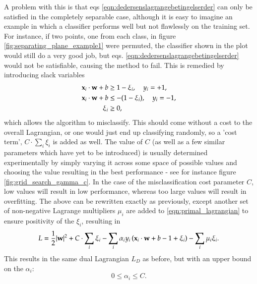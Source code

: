 A problem with this is that eqs \ref{eqn:dedersenslagrangebetingelserder} can only be satisfied in the completely separable case, although it is easy to imagine an example in which a classifier performs well but not flawlessly on the training set. For instance, if two points, one from each class, in figure \ref{fig:separating_plane_example1} were permuted, the classifier shown in the plot would still do a very good job, but eqs. \ref{eqn:dedersenslagrangebetingelserder} would not be satisfiable, causing the method to fail. This is remedied by introducing slack variables\cite{Boyd2004}
\begin{align}
\begin{split}
		\mathbf{x}_i\cdot \mathbf{w} + b &\ge 1 - \xi_i,\quad y_i = +1, \\
		\mathbf{x}_i\cdot \mathbf{w} + b &\le -(1 - \xi_i),\quad y_i = -1, \\
		\xi_i &\ge 0,
\end{split} \label{eqn:slack_variables}
\end{align}
which allows the algorithm to misclassify. This should come without a cost to the overall Lagrangian, or one would just end up classifying randomly, so a 'cost term', $C\cdot\sum_i\xi_i$ is added as well. The value of $C$ (as well as a few similar parameters which have yet to be introduced) is usually determined experimentally by simply varying it across some space of possible values and choosing the value resulting in the best performance - see for instance figure \ref{fig:grid_search_gamma_c}. In the case of the misclassification cost parameter $C$, low values will result in low performance, whereas too large values will result in overfitting. The above can be rewritten exactly as previously, except another set of non-negative Lagrange multipliers $\mu_i$ are added to \eqref{eqn:primal_lagrangian} to ensure positivity of the $\xi_i$, resulting in
\begin{equation}
	L = \frac{1}{2} |\mathbf{w}|^2 + C\cdot \sum_i\xi_i - \sum_i \alpha_i y_i \left( \mathbf{x}_i\cdot \mathbf{w} + b - 1 + \xi_i \right) - \sum_i\mu_i\xi_i. \label{eqn:langgrimlagrangian}
\end{equation}
This results in the same dual Lagrangian $L_D$ as before, but with an upper bound on the $\alpha_i$:
\begin{equation}
	0 \le \alpha_i \le C.
\end{equation}
